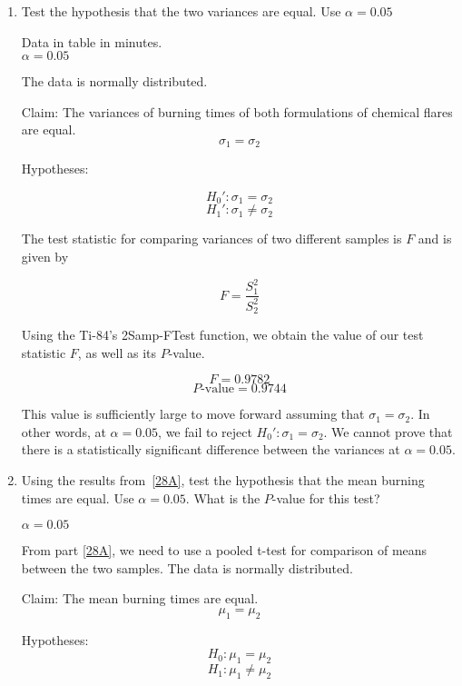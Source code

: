 \documentclass[../main.tex]{subfiles}
\begin{document}
\begin{enumerate}[label = (\alph*)]
    \item\label{28A}
        Test the hypothesis that the two variances are equal.
        Use \(\alpha = 0.05\)

        \givens{}
        Data in table in minutes.\\
        \(\alpha = 0.05\)

        \assumptions{}
        The data is normally distributed.

        \solution{}
        Claim: The variances of burning times of both formulations of chemical flares are equal.
        \[\sigma_1 = \sigma_2\]

        Hypotheses:

        \[H_0' : \sigma_1 = \sigma_2\]
        \[H_1' : \sigma_1 \ne \sigma_2\]

        The test statistic for comparing variances of two different samples is $F$ and is given by

        \[
            F = \frac{S_1^2}{S_2^2}    
        \]

        Using the Ti-84's 2Samp-FTest function, we obtain the value of our test statistic $F$, as well as its $P$-value.

        \[F = 0.9782\]
        \[P\textrm{-value} = 0.9744\]

        This value is sufficiently large to move forward assuming that \(\sigma_1=\sigma_2\). 
        In other words, at \(\alpha = 0.05\), we fail to reject \(H_0' : \sigma_1 = \sigma_2\).
        We cannot prove that there is a statistically significant difference between the variances at \(\alpha = 0.05\).
    \item 
        Using the results from~\ref{28A}, test the hypothesis that the mean burning times are equal.
        Use \(\alpha = 0.05\).
        What is the $P$-value for this test?

        \givens{}
        \(\alpha = 0.05\)

        \assumptions{}
        From part \ref{28A}, we need to use a pooled t-test for comparison of means between the two samples.
        The data is normally distributed.

        \solution{}

        Claim: The mean burning times are equal.
        \[\mu_1 = \mu_2\]

        Hypotheses:
        \[H_0 : \mu_1 = \mu_2\]
        \[H_1 : \mu_1 \ne \mu_2\]


\end{enumerate}
\end{document}
